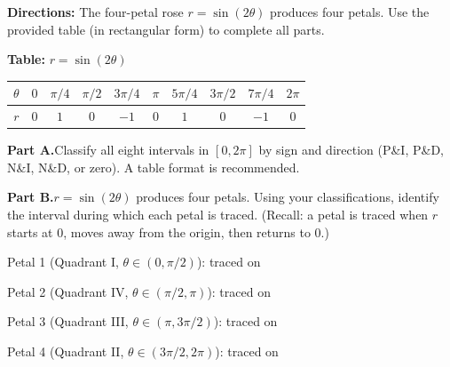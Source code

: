 \documentclass[10pt]{article}
\begin{document}
\begin{tcolorbox}[colback=white, colframe=black!40,
    title=\textbf{Tier E --- Extend},
    fonttitle=\bfseries, arc=2mm, left=3mm, right=3mm, top=2mm, bottom=2mm]

\textbf{Directions:} The four-petal rose $r = \sin(2\theta)$ produces four petals.
Use the provided table (in rectangular form) to complete all parts.

\vspace{6pt}
\textbf{Table:} $r = \sin(2\theta)$

\vspace{4pt}
\renewcommand{\arraystretch}{1.4}
\begin{tabular}{|c|c|c|c|c|c|c|c|c|c|}
\hline
$\theta$ & $0$ & $\pi/4$ & $\pi/2$ & $3\pi/4$ & $\pi$ & $5\pi/4$ & $3\pi/2$ & $7\pi/4$ & $2\pi$ \\
\hline
$r$ & $0$ & $1$ & $0$ & $-1$ & $0$ & $1$ & $0$ & $-1$ & $0$ \\
\hline
\end{tabular}

\vspace{8pt}
\textbf{Part A.}\quad Classify all eight intervals in $[0, 2\pi]$ by sign and direction
(P\&I, P\&D, N\&I, N\&D, or zero). A table format is recommended.


\vspace{6pt}
\textbf{Part B.}\quad $r = \sin(2\theta)$ produces four petals. Using your classifications,
identify the interval during which each petal is traced. (Recall: a petal is traced
when $r$ starts at 0, moves away from the origin, then returns to 0.)

\vspace{4pt}
Petal 1 (Quadrant I, $\theta \in (0, \pi/2)$): traced on \underline{\hspace{3.5cm}}

\vspace{4pt}
Petal 2 (Quadrant IV, $\theta \in (\pi/2, \pi)$): traced on \underline{\hspace{3.5cm}}

\vspace{4pt}
Petal 3 (Quadrant III, $\theta \in (\pi, 3\pi/2)$): traced on \underline{\hspace{3.5cm}}

\vspace{4pt}
Petal 4 (Quadrant II, $\theta \in (3\pi/2, 2\pi)$): traced on \underline{\hspace{3.5cm}}


\end{tcolorbox}
\end{document}
